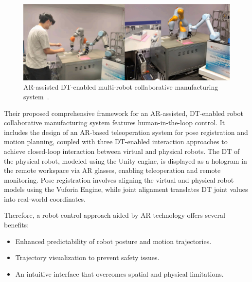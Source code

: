 \begin{figure}[!htpb]
    \centering
    \includegraphics[width=0.85\linewidth]{figs/physical-digital.png}
    \caption{\ac{AR}-assisted \ac{DT}-enabled multi-robot collaborative manufacturing system~\cite{LI2022102321}.}
    \label{fig:physical-digital}
\end{figure}

Their proposed comprehensive framework for an \ac{AR}-assisted, \ac{DT}-enabled robot collaborative manufacturing system features human-in-the-loop control.  It includes the design of an \ac{AR}-based teleoperation system for pose registration and motion planning, coupled with three \ac{DT}-enabled interaction approaches to achieve closed-loop interaction between virtual and physical robots. The \ac{DT} of the physical robot, modeled using the Unity engine, is displayed as a hologram in the remote workspace via \ac{AR} glasses, enabling teleoperation and remote monitoring. Pose registration involves aligning the virtual and physical robot models using the Vuforia Engine, while joint alignment translates \ac{DT} joint values into real-world coordinates.


Therefore, a robot control approach aided by \ac{AR} technology offers several benefits:
\begin{itemize}
    \item Enhanced predictability of robot posture and motion trajectories.
    \item Trajectory visualization to prevent safety issues.
    \item An intuitive interface that overcomes spatial and physical limitations.
\end{itemize}

